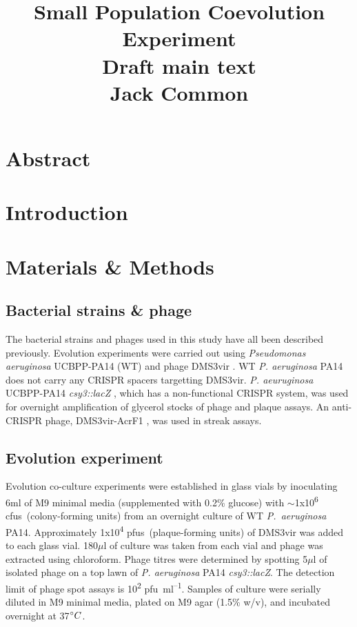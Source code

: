 \documentclass [12pt, a4paper, twoside]  {article}
\title{
	\raggedright
	\Huge{\textbf{Small Population Coevolution Experiment}}\\
	\Large{Draft main text}\\
	\Large{Jack Common}\\
	\vspace{.5cm}
}
\date{\vspace{-12ex}}
\newcommand{\super}{\textsuperscript}
\begin{document}
\maketitle

\section*{Abstract}

\section*{Introduction}

\section*{Materials \& Methods}

\subsection*{Bacterial strains \& phage}
The bacterial strains and phages used in this study have all been described previously. Evolution experiments were carried out using \textit{Pseudomonas aeruginosa} UCBPP-PA14 (WT) and phage DMS3vir \citep{cady2012crispr}. WT \textit{P. aeruginosa} PA14 does not carry any CRISPR spacers targetting DMS3vir. \textit{P. aeuruginosa} UCBPP-PA14 \textit{csy3::lacZ} \citep{zegans2009crispr}, which has a non-functional CRISPR system, was used for overnight amplification of glycerol stocks of phage and plaque assays. An anti-CRISPR phage, DMS3vir-AcrF1 \citep{vanhoute2016diversity}, was used in streak assays.

\subsection*{Evolution experiment}
Evolution co-culture experiments were established in glass vials by inoculating 6ml of M9 minimal media (supplemented with 0.2\% glucose) with $\sim$1x10\super{6} cfus\ (colony-forming units) from an overnight culture of WT \textit{P.~aeruginosa} PA14. Approximately 1x10\textsuperscript{4} pfus\ (plaque-forming units) of DMS3vir was added to each glass vial. 180$\mu$l of culture was taken from each vial and phage was extracted using chloroform. Phage titres were determined by spotting 5$\mu$l of isolated phage on a top lawn of \textit{P. aeruginosa} PA14 \textit{csy3::lacZ}. The detection limit of phage spot assays is 10\super{2} pfu\ ml\super{--1}. Samples of culture were serially diluted in M9 minimal media, plated on M9 agar (1.5\% w/v), and incubated overnight at 37$\degree{}C$. 
\end{document}
